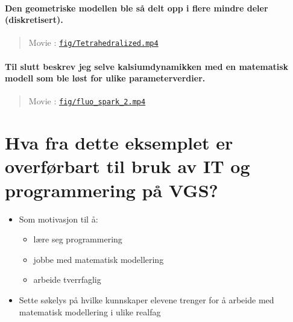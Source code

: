 \documentclass[%
oneside,                 %
final,                   %
10pt,norsk]{article}
\newenvironment{doconce:movie}{}{}
\newcounter{doconce:movie:counter}
\begin{document}
\paragraph{Den geometriske modellen ble så delt opp i flere mindre deler (diskretisert).}
\begin{doconce:movie}
\begin{quote}
Movie :  \href{run:fig/Tetrahedralized.mp4}{\nolinkurl{fig/Tetrahedralized.mp4}}
\end{quote}
\end{doconce:movie}



\paragraph{Til slutt beskrev jeg selve kalsiumdynamikken med en matematisk modell som ble løst for ulike parameterverdier.}
\begin{doconce:movie}
\begin{quote}
Movie :  \href{run:fig/fluo_spark_2.mp4}{\nolinkurl{fig/fluo_spark_2.mp4}}
\end{quote}
\end{doconce:movie}



\section*{Hva fra dette eksemplet er overførbart til bruk av IT og programmering på VGS?}

\begin{itemize}
\item Som motivasjon til å:
\begin{itemize}

  \item lære seg programmering

  \item jobbe med matematisk modellering

  \item arbeide tverrfaglig

\end{itemize}

\noindent
\item Sette søkelys på hvilke kunnskaper elevene trenger for å arbeide med matematisk modellering i ulike realfag
\end{itemize}
\end{document}
